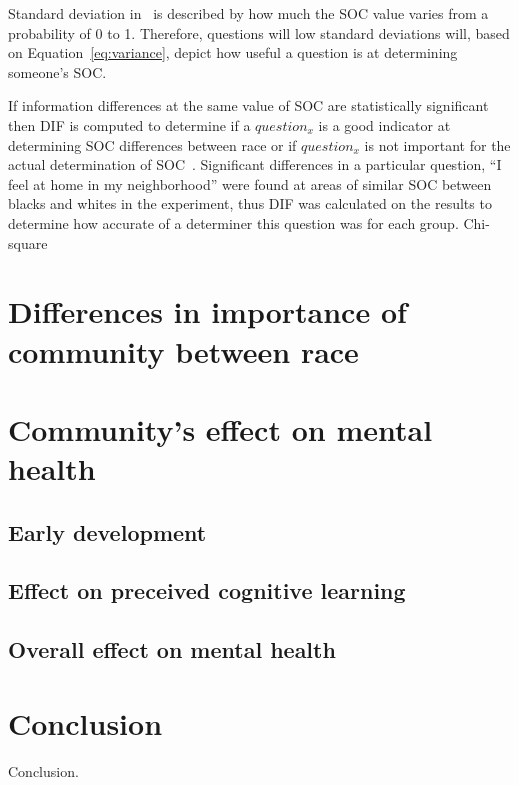 \documentclass{sig-alternate}
\begin{document}
Standard deviation in~\cite{disparities:2009} is described by how much the SOC value varies from a probability of 0 to 1. Therefore, questions will low standard deviations will, based on Equation~\ref{eq:variance}, depict how useful a question is at determining someone's SOC. 

If information differences at the same value of SOC are statistically significant then DIF is computed to determine if a $question_x$ is a good indicator at determining SOC differences between race or if $question_x$ is not important for the actual determination of SOC~\cite{disparities:2009}.
Significant differences in a particular question, ``I feel at home in my neighborhood'' were found at areas of similar SOC between blacks and whites in the experiment, thus DIF was calculated on the results to determine how accurate of a determiner this question was for each group. Chi-square 



\section{Differences in importance of community between race}


\section{Community's effect on mental health}
\subsection{Early development}
\subsection{Effect on preceived cognitive learning}
\subsection{Overall effect on mental health}



\section{Conclusion}
Conclusion.

\nocite{*}



\end{document}
